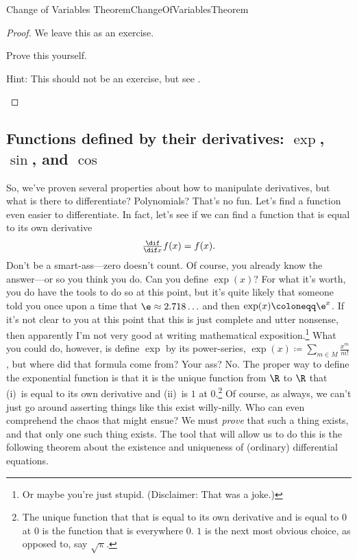 \begin{thm}{Change of Variables Theorem}{ChangeOfVariablesTheorem}
\begin{rmk}
\end{rmk}
\begin{proof}
We leave this as an exercise.
\begin{exr}[breakable=false]{}{}
Prove this yourself.
\begin{rmk}
Hint:  This should not be an exercise, but see \cite[Theorem 6.7.1]{Sally}.
\end{rmk}
\end{exr}
\end{proof}
\end{thm}

\subsection[Functions defined by their derivatives]{Functions defined by their derivatives:  \texorpdfstring{$\exp$}{exp}, \texorpdfstring{$\sin$}{sin}, and \texorpdfstring{$\cos$}{cos}}\label{sbs6.4.4}

So, we've proven several properties about how to manipulate derivatives, but what is there to differentiate?  Polynomials?  That's no fun.  Let's find a function even easier to differentiate.  In fact, let's see if we can find a function that is equal to its own derivative
\begin{equation}
\tfrac{\dif}{\dif x}f(x)=f(x).
\end{equation}
Don't be a smart-ass---zero doesn't count.  Of course, you already know the answer---or so you think you do.  Can you define $\exp (x)$?  For what it's worth, you do have the tools to do so at this point, but it's quite likely that someone told you once upon a time that $\e \approx 2.718\ldots $ and then $\exp (x)\coloneqq \e ^x$.  If it's not clear to you at this point that this is just complete and utter nonsense, then apparently I'm not very good at writing mathematical exposition.\footnote{Or maybe you're just stupid.  (Disclaimer:  That was a joke.)}  What you could do, however, is define $\exp$ by its power-series, $\exp (x)\coloneqq \sum _{m\in M}\frac{x^m}{m!}$, but where did that formula come from?  Your ass?  No.  The proper way to define the exponential function is that it is the unique function from $\R$ to $\R$ that (i)~is equal to its own derivative and (ii)~is $1$ at $0$.\footnote{The unique function that that is equal to its own derivative and is equal to $0$ at $0$ is the function that is everywhere $0$.  $1$ is the next most obvious choice, as opposed to, say $\sqrt{\uppi}$.}  Of course, as always, we can't just go around asserting things like this exist willy-nilly.  Who can even comprehend the chaos that might ensue?  We must \emph{prove} that such a thing exists, and that only one such thing exists.  The tool that will allow us to do this is the following theorem about the existence and uniqueness of (ordinary) differential equations.

